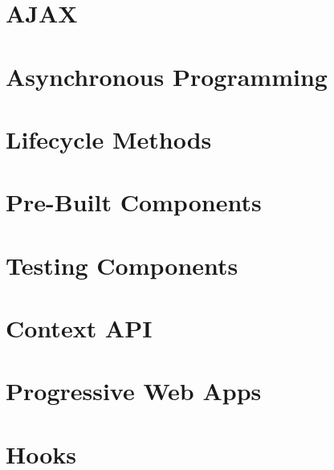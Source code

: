 \documentclass[b5paper,openany]{book}
\begin{document}
\tp


\tableofcontents



\chapter{AJAX}


\chapter{Asynchronous Programming}


\chapter{Lifecycle Methods}


\chapter{Pre-Built Components}


\chapter{Testing Components}


\chapter{Context API}


\chapter{Progressive Web Apps}


\chapter{Hooks}









\end{document}
